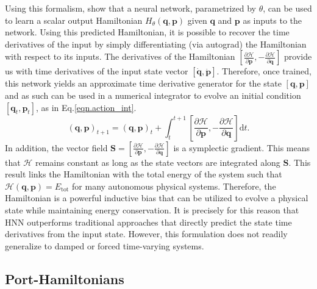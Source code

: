 \documentclass{article}
\begin{document}
Using this formalism, \cite{greydanus_hamiltonian_2019} 
show that a neural network, parametrized by $\theta$, can be used to learn a scalar output Hamiltonian $H_{\theta}(\mathbf{q},\mathbf{p})$ given $\mathbf{q}$ and $\mathbf{p}$ as inputs to the network. Using this predicted Hamiltonian, it is possible to recover the time derivatives of the input by simply differentiating (via autograd) the Hamiltonian with respect to its inputs. The derivatives of the Hamiltonian $\left [ \frac{\partial \mathcal{H}}{\partial \mathbf{p}},-\frac{\partial \mathcal{H}}{\partial \mathbf{q}} \right ]$ provide us with time derivatives of the input state vector $[\dot{\mathbf{q}},\dot{\mathbf{p}}]$. Therefore, once trained, this network yields an approximate time derivative generator for the state $[\mathbf{q},\mathbf{p}]$ and as such can be used in a numerical integrator to evolve an initial condition $[\mathbf{q}_t,\mathbf{p}_t]$, as in Eq.\ref{eqn.action_int}.
\begin{equation}
(\mathbf{q},\mathbf{p})_{t+1} = (\mathbf{q},\mathbf{p})_t + \int_t^{t+1} \left [ \frac{\partial \mathcal{H}}{\partial \mathbf{p}},-\frac{\partial \mathcal{H}}{\partial \mathbf{q}} \right ] \mathrm{d}t.
\label{eqn.action_int}
\end{equation}
In addition, the vector field $\mathbf{S} = \left [ \frac{\partial \mathcal{H}}{\partial \mathbf{p}},-\frac{\partial \mathcal{H}}{\partial \mathbf{q}} \right ]$ is a symplectic gradient. This means that $\mathcal{H}$ remains constant as long as the state vectors are integrated along $\mathbf{S}$. This result links the Hamiltonian with the total energy of the system such that $\mathcal{H}(\mathbf{q},\mathbf{p}) = E_{\mathrm{tot}}$ for many autonomous physical systems. Therefore, the Hamiltonian is a powerful inductive bias that can be utilized to evolve a physical state while maintaining energy conservation. It is precisely for this reason that HNN outperforms traditional approaches that directly predict the state time derivatives from the input state. However, this formulation does not readily generalize to damped or forced time-varying systems.

\subsection{Port-Hamiltonians}
\end{document}
